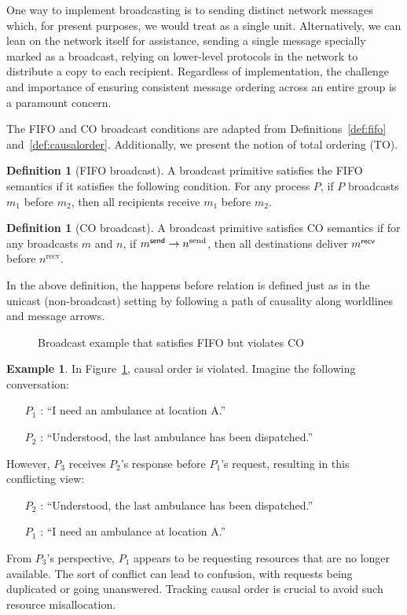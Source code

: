 \documentclass[]             %
{NASA}                       %
\theoremstyle{definition}
\newtheorem{example}[theorem]{Example}
\newtheorem{definition}[theorem]{Definition}
\providecommand{\tightlist}{%
  \setlength{\itemsep}{0pt}\setlength{\parskip}{0pt}}
\begin{document}
One way to implement broadcasting is to sending distinct network
messages which, for present purposes, we would treat as a single
unit. Alternatively, we can lean on the network itself for assistance,
sending a single message specially marked as a broadcast, relying on
lower-level protocols in the network to distribute a copy to each
recipient. Regardless of implementation, the challenge and importance
of ensuring consistent message ordering across an entire group is a
paramount concern.

The FIFO and CO broadcast conditions are adapted from
Definitions~\ref{def:fifo} and~\ref{def:causalorder}. Additionally, we
present the notion of total ordering (TO).

\begin{definition}[FIFO broadcast]
  \label{def:fifo-bcast}
  A broadcast primitive satisfies the FIFO semantics if it satisfies
  the following condition. For any process $P$, if $P$ broadcasts
  $m_1$ before $m_2$, then all recipients receive $m_1$ before $m_2$.
\end{definition}

\begin{definition}[CO broadcast]
  \label{def:causalorder-bcast}
  A broadcast primitive satisfies CO semantics if for any broadcasts
  $m$ and $n$, if $m_{}^{\mathsf{send}} \to n^{\textrm{send}}$, then all
  destinations deliver $m_{}^{\mathsf{recv}}$ before $n^{\textrm{recv}}$.
\end{definition}
In the above definition, the happens before relation is defined just
as in the unicast (non-broadcast) setting by following a path of
causality along worldlines and message arrows.

\begin{figure}[h]
  \centering 
  \caption{Broadcast example that satisfies FIFO but violates CO}
  \label{fig:broadcast-fifo-1}
\end{figure}

\begin{example}
  In Figure~\ref{fig:broadcast-fifo-1}, causal order is violated. Imagine the following conversation:
  \begin{itemize}
    \tightlist
  \item [$P_1$]: ``I need an ambulance at location A.''
  \item [$P_2$]: ``Understood, the last ambulance has been dispatched.''
  \end{itemize}
  However, $P_3$ receives $P_2$'s response before $P_1$'s request, resulting in this conflicting view:
  \begin{itemize}
    \tightlist
  \item [$P_2$]: ``Understood, the last ambulance has been dispatched.''
  \item [$P_1$]: ``I need an ambulance at location A.''
  \end{itemize}
  From $P_3$'s perspective, $P_1$ appears to be requesting resources
  that are no longer available. The sort of conflict can lead to
  confusion, with requests being duplicated or going
  unanswered. Tracking causal order is crucial to avoid such resource
  misallocation.
\end{example}
\end{document}
